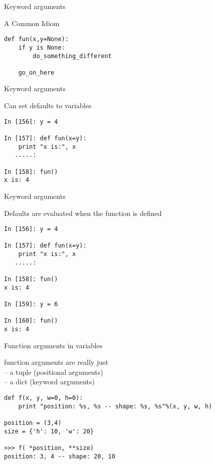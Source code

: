 \documentclass{beamer}
\begin{document}
\begin{frame}[fragile]{Keyword arguments}

 {\Large A Common Idiom}

\vfill
\begin{verbatim}
def fun(x,y=None):
    if y is None:
        do_something_different

    go_on_here
\end{verbatim}
\vfill

\end{frame} 

\begin{frame}[fragile]{Keyword arguments}

 {\Large Can set defaults to variables}

\begin{verbatim}
In [156]: y = 4

In [157]: def fun(x=y):
    print "x is:", x
   .....:     

In [158]: fun()
x is: 4

\end{verbatim}

\end{frame} 

\begin{frame}[fragile]{Keyword arguments}

{\Large Defaults are evaluated when the function is defined}

\begin{verbatim}
In [156]: y = 4

In [157]: def fun(x=y):
    print "x is:", x
   .....:     

In [158]: fun()
x is: 4

In [159]: y = 6

In [160]: fun()
x is: 4
\end{verbatim}

\end{frame} 


\begin{frame}[fragile]{Function arguments in variables}

{\Large function arguments are really just\\
 -- a tuple (positional arguments) \\
 -- a dict (keyword arguments) \\
}
\begin{verbatim}
def f(x, y, w=0, h=0):
    print "position: %s, %s -- shape: %s, %s"%(x, y, w, h)

position = (3,4)
size = {'h': 10, 'w': 20}

>>> f( *position, **size)
position: 3, 4 -- shape: 20, 10
\end{verbatim}

\end{frame} 
\end{document}
